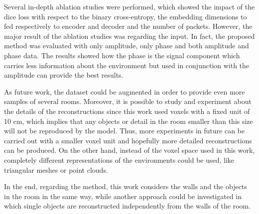 \documentclass[binding=0.6cm,noexaminfo]{sapthesis}
\begin{document}
Several in-depth ablation studies were performed, which showed the impact of the dice loss with respect to the binary cross-entropy, the embedding dimensions to fed respectively to encoder and decoder and the number of packets. However, the major result of the ablation studies was regarding the input. In fact, the proposed method was evaluated with only amplitude, only phase and both amplitude and phase data. The results showed how the phase is the signal component which carries less information about the environment but used in conjunction with the amplitude can provide the best results.

As future work, the dataset could be augmented in order to provide even more samples of several rooms. 
Moreover, it is possible to study and experiment about the details of the reconstructions since this work used voxels with a fixed unit of 10 cm, which implies that any objects or detail in the room smaller than this size will not be reproduced by the model. Thus, more experiments in future can be carried out with a smaller voxel unit and hopefully more detailed reconstructions can be produced. On the other hand, instead of the voxel space used in this work, completely different representations of the environments could be used, like triangular meshes or point clouds.

In the end, regarding the method, this work considers the walls and the objects in the room in the same way, while another approach could be investigated in which single objects are reconstructed independently from the walls of the room.


\backmatter
\cleardoublepage
{} %

\end{document}
